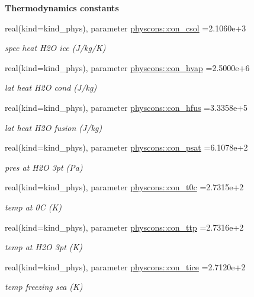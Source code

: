 \begin{Indent}{\bf Thermodynamics constants}
\begin{DoxyCompactItemize}
real(kind=kind\+\_\+phys), parameter \hyperlink{namespacephyscons_afad2954199233ac4d97f3f690e255836}{physcons\+::con\+\_\+csol} =2.\+1060e+3
\begin{DoxyCompactList}\small\item\em spec heat H2O ice (J/kg/K) \end{DoxyCompactList}\item 
real(kind=kind\+\_\+phys), parameter \hyperlink{namespacephyscons_a65ec8e424f61ccfe8520bf7cc5c070f8}{physcons\+::con\+\_\+hvap} =2.\+5000e+6
\begin{DoxyCompactList}\small\item\em lat heat H2O cond (J/kg) \end{DoxyCompactList}\item 
real(kind=kind\+\_\+phys), parameter \hyperlink{namespacephyscons_a6d9481f4395882116e2a26bc85a617a6}{physcons\+::con\+\_\+hfus} =3.\+3358e+5
\begin{DoxyCompactList}\small\item\em lat heat H2O fusion (J/kg) \end{DoxyCompactList}\item 
real(kind=kind\+\_\+phys), parameter \hyperlink{namespacephyscons_a86f12d814a25d633cd0c05b90cd84ec8}{physcons\+::con\+\_\+psat} =6.\+1078e+2
\begin{DoxyCompactList}\small\item\em pres at H2O 3pt (Pa) \end{DoxyCompactList}\item 
real(kind=kind\+\_\+phys), parameter \hyperlink{namespacephyscons_abdc3bd91e0599b1f58762612f02871e4}{physcons\+::con\+\_\+t0c} =2.\+7315e+2
\begin{DoxyCompactList}\small\item\em temp at 0C (K) \end{DoxyCompactList}\item 
real(kind=kind\+\_\+phys), parameter \hyperlink{namespacephyscons_aa50af91a0e1d09edce2d2e6c4d7afc86}{physcons\+::con\+\_\+ttp} =2.\+7316e+2
\begin{DoxyCompactList}\small\item\em temp at H2O 3pt (K) \end{DoxyCompactList}\item 
real(kind=kind\+\_\+phys), parameter \hyperlink{namespacephyscons_af292f4e2670e56c932f2e2a80e33ef9f}{physcons\+::con\+\_\+tice} =2.\+7120e+2
\begin{DoxyCompactList}\small\item\em temp freezing sea (K) \end{DoxyCompactList}\item 

\end{DoxyCompactItemize}
\end{Indent}
